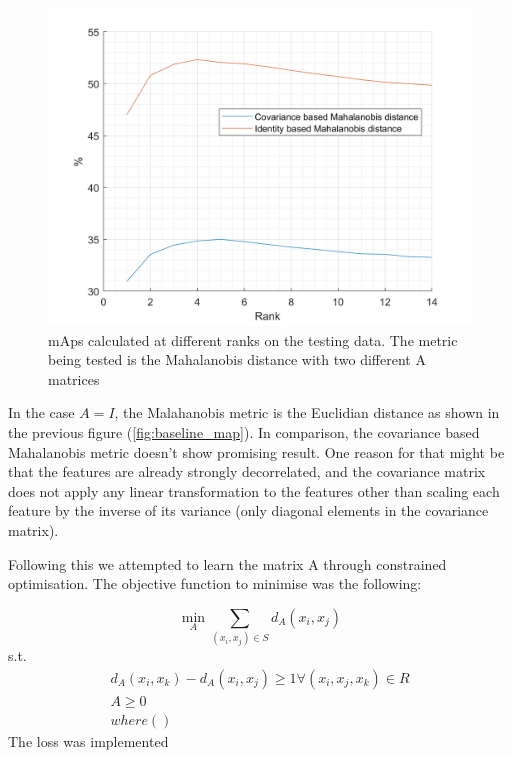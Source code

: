 \documentclass[10pt,technote]{IEEEtran}
\begin{document}
\begin{figure}
    \centering
    \includegraphics[width=\linewidth]{Graphs/maha_Map.png}
    \caption{mAps calculated at different ranks on the testing data. The metric being tested is the Mahalanobis distance with two different A matrices}
    \label{fig:maha_map}
\end{figure}

In the case $A = I$, the Malahanobis metric is the Euclidian distance as shown in the previous figure (\ref{fig:baseline_map}). In comparison, the covariance based Mahalanobis metric doesn't show promising result. One reason for that might be that the features are already strongly decorrelated, and the covariance matrix does not apply any linear transformation to the features other than scaling each feature by the inverse of its variance (only diagonal elements in the covariance matrix). 

Following this we attempted to learn the matrix A through constrained optimisation. The objective function to minimise was the following:

\begin{equation}
    \min_{A}\sum_{(x_i, x_j) \in S}{d_A (x_i, x_j)}
\end{equation}
s.t.
\begin{equation}
    \begin{aligned}
        d_A{(x_i, x_k)} - d_A (x_i, x_j) \ge 1 \forall(x_i, x_j, x_k) \in{R}  \\
        A \ge 0 \\
        where ()
    \end{aligned}
\end{equation}
The loss was implemented 
\end{document}
